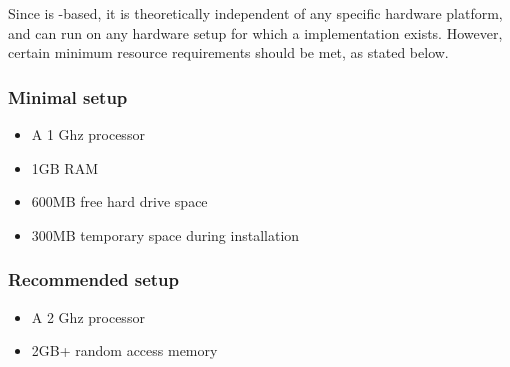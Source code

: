 Since \app{} is -based, it is theoretically independent of any specific hardware platform, and can run on any hardware setup for which a  implementation exists. However, certain minimum resource requirements should be met, as stated below.

\subsubsection{Minimal setup}
\begin{itemize}
\item A 1 Ghz processor
\item 1GB RAM
\item 600MB free hard drive space
\item 300MB temporary space during installation
\end{itemize}
\subsubsection{Recommended setup}
\begin{itemize}
\item A 2 Ghz processor
\item 2GB+ random access memory

\end{itemize}
